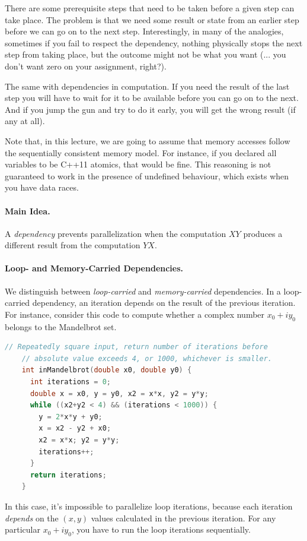 \documentclass[a4paper]{report}
\begin{document}
There are some prerequisite steps that need to be taken before a given step can take place. The problem is that we need some result or state from an earlier step before we can go on to the next step. Interestingly, in many of the analogies, sometimes if you fail to respect the dependency, nothing physically stops the next step from taking place, but the outcome might not be what you want (... you don't want zero on your assignment, right?).

The same with dependencies in computation. If you need the result of the last step you will have to wait for it to be available before you can go on to the next. And if you jump the gun and try to do it early, you will get the wrong result (if any at all).

Note that, in this lecture, we are going to assume that memory accesses follow the
sequentially consistent memory model. For instance, if you declared all variables
to be C++11 atomics, that would be fine. This reasoning is not guaranteed to work
in the presence of undefined behaviour, which exists when you have data races.

\paragraph{Main Idea.} A \emph{dependency} prevents parallelization
when the computation $XY$ produces a different result from the
computation $YX$.

\paragraph{Loop- and Memory-Carried Dependencies.} We distinguish
between \emph{loop-carried} and \emph{memory-carried} dependencies.
In a loop-carried dependency, an iteration depends on the result of
the previous iteration. For instance, consider this code to
compute whether a complex number $x_0 + iy_0$ belongs to the Mandelbrot
set.

{\small \begin{lstlisting}[language=C]
    // Repeatedly square input, return number of iterations before 
    // absolute value exceeds 4, or 1000, whichever is smaller.
    int inMandelbrot(double x0, double y0) {
      int iterations = 0;
      double x = x0, y = y0, x2 = x*x, y2 = y*y;
      while ((x2+y2 < 4) && (iterations < 1000)) {
        y = 2*x*y + y0;
        x = x2 - y2 + x0;
        x2 = x*x; y2 = y*y;
        iterations++;
      }
      return iterations;
    }
\end{lstlisting} }
In this case, it's impossible to parallelize loop iterations, because
each iteration \emph{depends} on the $(x, y)$ values calculated in the
previous iteration. For any particular $x_0 + iy_0$, you have to run the
loop iterations sequentially.
\end{document}
